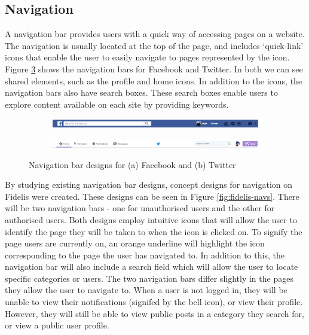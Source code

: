 \subsection{Navigation}
A navigation bar provides users with a quick way of accessing pages on a website. The navigation is usually located at the top of the page, and includes `quick-link' icons that enable the user to easily navigate to pages represented by the icon. Figure \ref{fig:navs} shows the navigation bars for Facebook and Twitter. In both we can see shared elements, such as the profile and home icons. In addition to the icons, the navigation bars also have search boxes. These search boxes enable users to explore content available on each site by providing keywords.

\begin{figure}[H]
\centering
\begin{subfigure}{1\linewidth}
	\includegraphics[width=1\linewidth]{Images/Design/fb-nav}
	\caption{}
	\label{fig:fb-nav}
\end{subfigure}
\begin{subfigure}{1\linewidth}
	\includegraphics[width=1\linewidth]{Images/Design/twitter-nav}
	\caption{}
	\label{fig:twitter-nav}
\end{subfigure}
\caption{Navigation bar designs for (a) Facebook and (b) Twitter}
\label{fig:navs}
\end{figure}

By studying existing navigation bar designs, concept designs for navigation on Fidelis were created. These designs can be seen in Figure \ref{fig:fidelis-navs}. There will be two navigation bars - one for unauthorised users and the other for authorised users. Both designs employ intuitive icons that will allow the user to identify the page they will be taken to when the icon is clicked on. To signify the page users are currently on, an orange underline will highlight the icon corresponding to the page the user has navigated to. In addition to this, the navigation bar will also include a search field which will allow the user to locate specific categories or users. The two navigation bars differ slightly in the pages they allow the user to navigate to. When a user is not logged in, they will be unable to view their notifications (signifed by the bell icon), or view their profile. However, they will still be able to view public posts in a category they search for, or view a public user profile.

